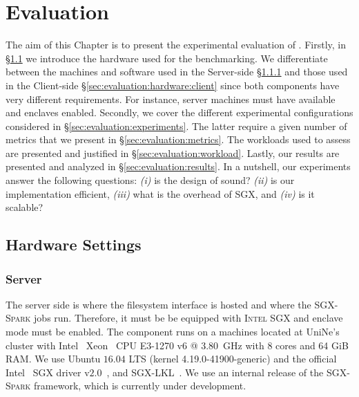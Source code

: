 \chapter{Evaluation} \label{chap:evaluation}

The aim of this Chapter is to present the experimental evaluation of \projName.
Firstly, in \S\ref{sec:evaluation:hardware} we introduce the hardware used for the benchmarking.
We differentiate between the machines and software used in the Server-side \S\ref{sec:evaluation:hardware:server} and those used in the Client-side \S\ref{sec:evaluation:hardware:client} since both components have very different requirements.
For instance, server machines must have \sgx available and enclaves enabled.
Secondly, we cover the different experimental configurations considered in \S\ref{sec:evaluation:experiments}.
The latter require a given number of metrics that we present in \S\ref{sec:evaluation:metrics}.
The workloads used to assess \projName are presented and justified in \S\ref{sec:evaluation:workload}.
Lastly, our results are presented and analyzed in \S\ref{sec:evaluation:results}.
In a nutshell, our experiments answer the following questions: \emph{(i)} is the design of \projName sound? \emph{(ii)} is our implementation efficient, \emph{(iii)} what is the overhead of SGX, and \emph{(iv)} is it scalable?

\section{Hardware Settings} \label{sec:evaluation:hardware}

\subsection{Server} \label{sec:evaluation:hardware:server}
The server side is where the filesystem interface is hosted and where the \textsc{SGX-Spark} jobs run.
Therefore, it must be be equipped with \textsc{Intel SGX} and enclave mode must be enabled. 
The component runs on a machines located at UniNe's cluster with Intel~\textregistered\xspace Xeon~\textregistered\xspace CPU E3-1270 v6 @ $3.80$~GHz with 8 cores and 64 GiB RAM. 
We use Ubuntu $16.04$ LTS (kernel 4.19.0-41900-generic) and the official Intel~\textregistered\xspace SGX driver v$2.0$~\cite{sgx-driver}, and \textsc{SGX-LKL}~\cite{sgx-lkl}. 
We use an internal release of the \textsc{SGX-Spark} framework, which is currently under development.

